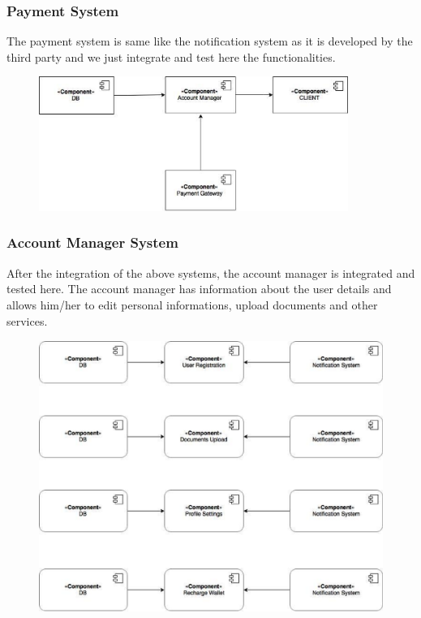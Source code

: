 \subsubsection*{Payment System}
The payment system is same like the notification system as it is developed by the third party and we just integrate and test here the functionalities.

\begin{figure}[H]
	\centering
	\includegraphics[height=4.38cm,keepaspectratio]{figures/components_payment.eps}
	\label{fig:components_payment}
\end{figure}

\subsubsection*{Account Manager System}
After the integration of the above systems, the account manager is integrated and tested here. The account manager has information about the user details and allows him/her to edit personal informations, upload documents and other services. 

\begin{figure}[H]
	\centering
	\includegraphics[height=8.86cm,keepaspectratio]{figures/itp9.eps}
	\label{fig:itp9}
\end{figure}


